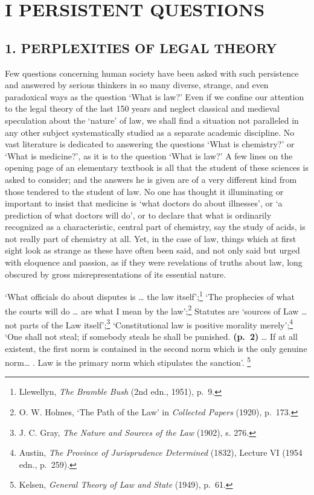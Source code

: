 \section{\texorpdfstring{\textbf{I PERSISTENT
QUESTIONS}}{I PERSISTENT QUESTIONS}}\label{i-persistent-questions}

\subsection{\texorpdfstring{\textbf{1. PERPLEXITIES OF LEGAL
THEORY}}{1. PERPLEXITIES OF LEGAL THEORY}}\label{perplexities-of-legal-theory}

Few questions concerning human society have been asked with such
persistence and answered by serious thinkers in so many diverse,
strange, and even paradoxical ways as the question `What is law?' Even
if we confine our attention to the legal theory of the last 150 years
and neglect classical and medieval speculation about the `nature' of
law, we shall find a situation not paralleled in any other subject
systematically studied as a separate academic discipline. No vast
literature is dedicated to answering the questions `What is chemistry?'
or `What is medicine?', as it is to the question `What is law?' A few
lines on the opening page of an elementary textbook is all that the
student of these sciences is asked to consider; and the answers he is
given are of a very different kind from those tendered to the student of
law. No one has thought it illuminating or important to insist that
medicine is `what doctors do about illnesses', or `a prediction of what
doctors will do', or to declare that what is ordinarily recognized as a
characteristic, central part of chemistry, say the study of acids, is
not really part of chemistry at all. Yet, in the case of law, things
which at first sight look as strange as these have often been said, and
not only said but urged with eloquence and passion, as if they were
revelations of truths about law, long obscured by gross
misrepresentations of its essential nature.

`What officials do about disputes is \ldots{} the law
itself';\footnote{Llewellyn, \emph{The Bramble Bush} (2nd edn., 1951),
  p.~9.} `The prophecies of what the courts will do \ldots{} are what I
mean by the law';\footnote{O. W. Holmes, `The Path of the Law' in
  \emph{Collected Papers} (1920), p.~173.} Statutes are `sources of Law
\ldots{} not parts of the Law itself';\footnote{J. C. Gray, \emph{The
  Nature and Sources of the Law} (1902), s. 276.} `Constitutional law is
positive morality merely';\footnote{Austin, \emph{The Province of
  Jurisprudence Determined} (1832), Lecture VI (1954 edn., p.~259).}
`One shall not steal; if somebody steals he shall be punished.
\textbf{(p.~2)} \ldots{} If at all existent, the first norm is contained
in the second norm which is the only genuine norm\ldots{} . Law is the
primary norm which stipulates the sanction'. \footnote{Kelsen,
  \emph{General Theory of Law and State} (1949), p.~61.}

